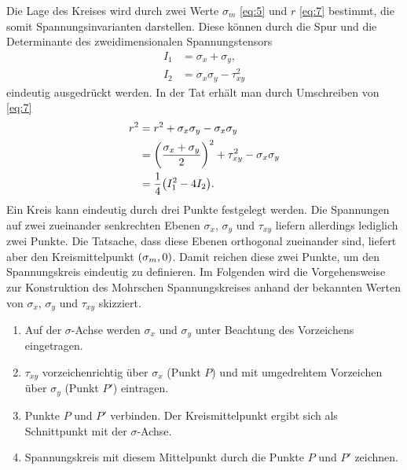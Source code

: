 \documentclass{lecture}
\begin{document}
    Die Lage des Kreises wird durch zwei Werte \(\sigma_m\) \eqref{eq:5} und \(r\) \eqref{eq:7} bestimmt, die somit Spannungsinvarianten darstellen.
    Diese können durch die Spur und die Determinante des zweidimensionalen Spannungstensors
    \begin{align*}
        I_1 &= \sigma_x + \sigma_y,\\
        I_2 &= \sigma_x \sigma_y - \tau_{xy}^2
    \end{align*}
    eindeutig ausgedrückt werden.
    In der Tat erhält man durch Umschreiben von \eqref{eq:7}
    \begin{align*}
        r^2 &= r^2 + \sigma_x \sigma_y - \sigma_x \sigma_y\\
        &= \parentheses*{\frac{\sigma_x + \sigma_y}{2}}^2 + \tau_{xy}^2 - \sigma_x \sigma_y\\
        &= \frac{1}{4}\parentheses*{I_1^2 - 4I_2}.
    \end{align*}
    Ein Kreis kann eindeutig durch drei Punkte festgelegt werden.
    Die Spannungen auf zwei zueinander senkrechten Ebenen \(\sigma_x\), \(\sigma_y\) und \(\tau_{xy}\) liefern allerdings lediglich zwei Punkte.
    Die Tatsache, dass diese Ebenen orthogonal zueinander sind, liefert aber den Kreismittelpunkt \(\parentheses*{\sigma_m, 0}\).
    Damit reichen diese zwei Punkte, um den Spannungskreis eindeutig zu definieren.
    Im Folgenden wird die Vorgehensweise zur Konstruktion des Mohrschen Spannungskreises anhand der bekannten Werten von \(\sigma_x\), \(\sigma_y\) und \(\tau_{xy}\) skizziert.
    \begin{enumerate}
        \item Auf der \(\sigma\)-Achse werden \(\sigma_x\) und \(\sigma_y\) unter Beachtung des Vorzeichens eingetragen.
        \item \(\tau_{xy}\) vorzeichenrichtig über \(\sigma_x\) (Punkt \(P\)) und mit umgedrehtem Vorzeichen über \(\sigma_y\) (Punkt \(P'\)) eintragen.
        \item Punkte \(P\) und \(P'\) verbinden.
        Der Kreismittelpunkt ergibt sich als Schnittpunkt mit der \(\sigma\)-Achse.
        \item Spannungskreis mit diesem Mittelpunkt durch die Punkte \(P\) und \(P'\) zeichnen.
    \end{enumerate}
\end{document}
